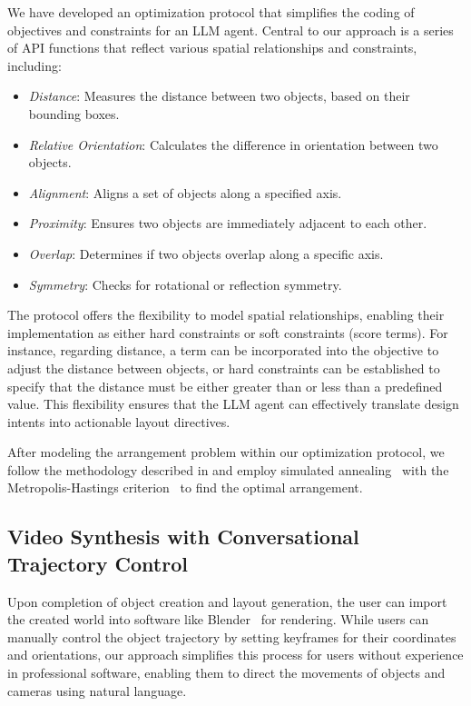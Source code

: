 We have developed an optimization protocol that simplifies the coding of objectives and constraints for an LLM agent. Central to our approach is a series of API functions that reflect various spatial relationships and constraints, including:
\begin{itemize}
    \item \emph{Distance}: Measures the distance between two objects, based on their bounding boxes.
    \item \emph{Relative Orientation}: Calculates the difference in orientation between two objects.
    \item \emph{Alignment}: Aligns a set of objects along a specified axis.
    \item \emph{Proximity}: Ensures two objects are immediately adjacent to each other.
    \item \emph{Overlap}: Determines if two objects overlap along a specific axis.
    \item \emph{Symmetry}: Checks for rotational or reflection symmetry.
\end{itemize}
The protocol offers the flexibility to model spatial relationships, enabling their implementation as either hard constraints or soft constraints (score terms). For instance, regarding distance, a term can be incorporated into the objective to adjust the distance between objects, or hard constraints can be established to specify that the distance must be either greater than or less than a predefined value. This flexibility ensures that the LLM agent can effectively translate design intents into actionable layout directives.

After modeling the arrangement problem within our optimization protocol, we follow the methodology described in \cite{yu2011make} and employ simulated annealing~\cite{kirkpatrick1984optimization} with the Metropolis-Hastings criterion~\cite{hastings1970monte, metropolis1953equation} to find the optimal arrangement. 





\subsection{Video Synthesis with Conversational Trajectory Control}
\label{sec:traj}
Upon completion of object creation and layout generation, the user can import the created world into software like Blender~\cite{blender} for rendering. While users can manually control the object trajectory by setting keyframes for their coordinates and orientations, our approach simplifies this process for users without experience in professional software, enabling them to direct the movements of objects and cameras using natural language.


